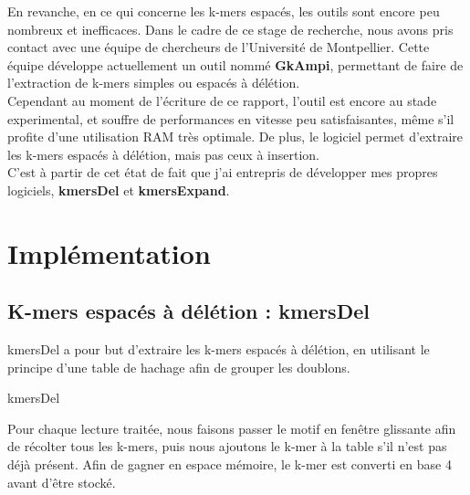 \documentclass{report}
\begin{document}
      En revanche, en ce qui concerne les k-mers espacés, les outils sont encore peu nombreux et inefficaces.
      Dans le cadre de ce stage de recherche, nous avons pris contact avec une équipe de chercheurs de l'Université de Montpellier. Cette équipe développe actuellement un outil nommé \textbf{GkAmpi}\cite{Mancheron}, permettant de faire de l'extraction de k-mers simples ou espacés à délétion.\\

      Cependant au moment de l'écriture de ce rapport, l'outil est encore au stade experimental, et souffre de performances en vitesse peu satisfaisantes, même s'il profite d'une utilisation RAM très optimale. De plus, le logiciel permet d'extraire les k-mers espacés à délétion, mais pas ceux à insertion.\\

      C'est à partir de cet état de fait que j'ai entrepris de développer mes propres logiciels, \textbf{kmersDel} et \textbf{kmersExpand}.
  \chapter{Implémentation}
    \section{K-mers espacés à délétion : kmersDel}
      kmersDel a pour but d'extraire les k-mers espacés à délétion, en utilisant le principe d'une table de hachage afin de grouper les doublons.\bigskip\\
      \normalsize
      \begin{algorithm}[H]{
        \caption{kmersDel}
      }\end{algorithm}\bigskip
      \large
      Pour chaque lecture traitée, nous faisons passer le motif en fenêtre glissante afin de récolter tous les k-mers, puis nous ajoutons le k-mer à la table s'il n'est pas déjà présent. Afin de gagner en espace mémoire, le k-mer est converti en base 4 avant d'être stocké.\\
\end{document}
